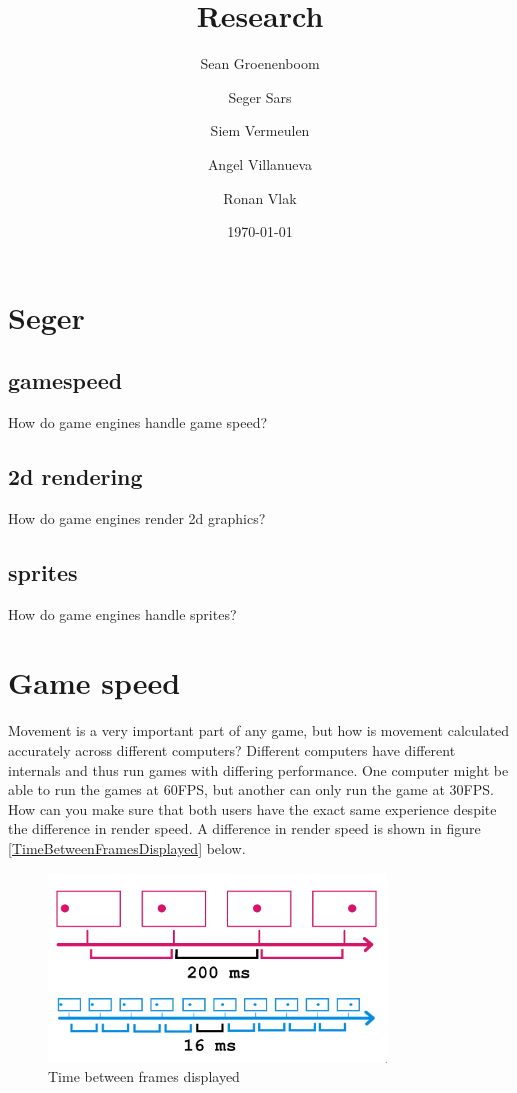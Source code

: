 \documentclass{article} %
\title{Research} %
\author{Sean Groenenboom \and Seger Sars \and Siem Vermeulen \and Angel Villanueva \and Ronan Vlak} %
\date{\today} %
\begin{document}
\maketitle %
\newpage

\tableofcontents %
\newpage

\section{Seger}

\subsection{gamespeed}
How do game engines handle game speed?
\subsection{2d rendering}
How do game engines render 2d graphics?
\subsection{sprites}
How do game engines handle sprites?
\newpage
\section{Game speed}
Movement is a very important part of any game, but how is movement calculated accurately across different computers?
Different computers have different internals and thus run games with differing performance.
One computer might be able to run the games at 60FPS, but another can only run the game at 30FPS.
How can you make sure that both users have the exact same experience despite the difference in render speed.
A difference in render speed is shown in figure \autoref{TimeBetweenFramesDisplayed} below.
\begin{figure}[h!]
	\centering
	\includegraphics[width=0.8\textwidth]{time_between_frames.png}
	\caption{Time between frames displayed}
	\label{TimeBetweenFramesDisplayed}
\end{figure}
\end{document}

